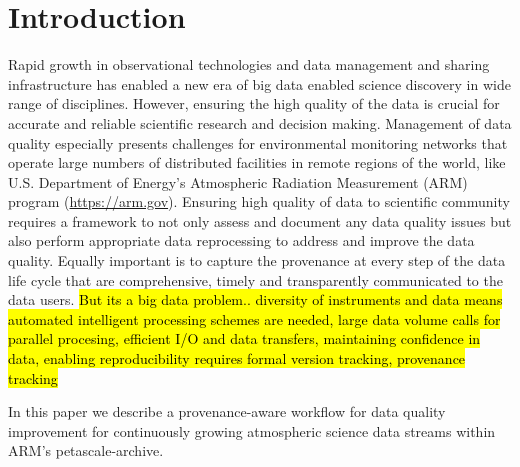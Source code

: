 \section{Introduction}
Rapid growth in observational technologies and data management and
sharing infrastructure has enabled a new era of big data enabled science
discovery in wide range of disciplines. However, ensuring the high
quality of the data is crucial for accurate and reliable scientific
research and decision making. Management of data quality especially
presents challenges for environmental monitoring networks that operate
large numbers of distributed facilities in remote regions of the world,
like U.S. Department of Energy's Atmospheric Radiation Measurement (ARM)
program (\url{https://arm.gov}). Ensuring high quality of data to
scientific community requires a framework to not only assess and
document any data quality issues but also perform appropriate data reprocessing to
address and improve the data quality.
Equally important is to capture the provenance at every step of
the data life cycle that are comprehensive, timely and transparently
communicated to the data users.
\hl{But its a big data problem.. diversity of instruments and data means
	automated intelligent processing schemes are needed, large data
		volume calls for parallel procesing, efficient I/O and data
		transfers, maintaining confidence in data, enabling
		reproducibility requires formal version tracking, provenance
		tracking}

In this paper we describe a provenance-aware workflow for
data quality improvement for continuously growing
atmospheric science data streams within ARM's petascale-archive.



